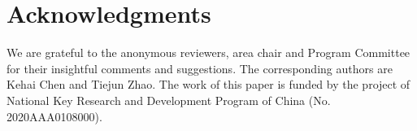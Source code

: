 \documentclass[11pt,a4paper]{article}
\begin{document}
\section*{Acknowledgments}
We are grateful to the anonymous reviewers, area chair and Program Committee for their insightful comments and suggestions.
The corresponding authors are Kehai Chen and Tiejun Zhao.
The work of this paper is funded by the project of National Key Research and Development Program of China (No. 2020AAA0108000).




\end{document}
